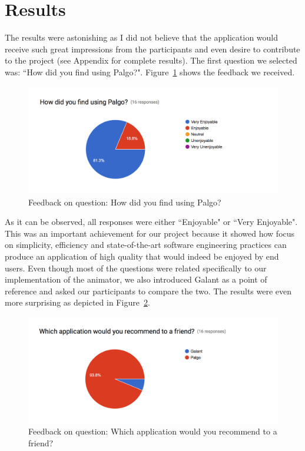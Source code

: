\documentclass{l4proj}
\begin{document}
\section{Results}

The results were astonishing as I did not believe that the application would receive such great impressions from the participants and
even desire to contribute to the project (see Appendix for complete results). The first question we selected was: ``How did you find using Palgo?".
Figure~\ref{fig:questionnaire-1} shows the feedback we received.

\begin{figure}[!ht]
    \centering
    \includegraphics[scale=0.6]{questionnaire-1}
    \caption{Feedback on question: How did you find using Palgo?}
    \label{fig:questionnaire-1}
\end{figure}

As it can be observed, all responses were either ``Enjoyable" or ``Very Enjoyable". This was an
important achievement for our project because it showed how focus on simplicity, efficiency and state-of-the-art
software engineering practices
can produce an application of high quality that would indeed be enjoyed by end users. Even though most of the questions
were related specifically to our implementation of the animator, we also introduced Galant as a point of reference and
asked our participants to compare the two. The results were even more surprising as depicted in Figure~\ref{fig:questionnaire-2}.

\begin{figure}[!ht]
    \centering
    \includegraphics[scale=0.6]{questionnaire-2}
    \caption{Feedback on question: Which application would you recommend to a friend?}
    \label{fig:questionnaire-2}
\end{figure}
\end{document}
